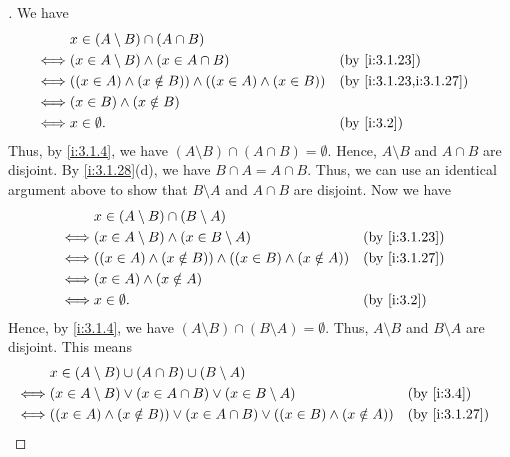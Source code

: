 \begin{proof}[]
  We have
  \begin{align*}
         & x \in (A \setminus B) \cap (A \cap B)                                                        \\
    \iff & (x \in A \setminus B) \land (x \in A \cap B)                     &  & \by{i:3.1.23}          \\
    \iff & ((x \in A) \land (x \notin B)) \land ((x \in A) \land (x \in B)) &  & \by{i:3.1.23,i:3.1.27} \\
    \iff & (x \in B) \land (x \notin B)                                                                 \\
    \iff & x \in \emptyset.                                                 &  & \by{i:3.2}
  \end{align*}
  Thus, by \cref{i:3.1.4}, we have \((A \setminus B) \cap (A \cap B) = \emptyset\).
  Hence, \(A \setminus B\) and \(A \cap B\) are disjoint.
  By \cref{i:3.1.28}(d), we have \(B \cap A = A \cap B\).
  Thus, we can use an identical argument above to show that \(B \setminus A\) and \(A \cap B\) are disjoint.
  Now we have
  \begin{align*}
         & x \in (A \setminus B) \cap (B \setminus A)                                             \\
    \iff & (x \in A \setminus B) \land (x \in B \setminus A)                   &  & \by{i:3.1.23} \\
    \iff & ((x \in A) \land (x \notin B)) \land ((x \in B) \land (x \notin A)) &  & \by{i:3.1.27} \\
    \iff & (x \in A) \land (x \notin A)                                                           \\
    \iff & x \in \emptyset.                                                    &  & \by{i:3.2}
  \end{align*}
  Hence, by \cref{i:3.1.4}, we have \((A \setminus B) \cap (B \setminus A) = \emptyset\).
  Thus, \(A \setminus B\) and \(B \setminus A\) are disjoint.
  This means
  \begin{align*}
         & x \in (A \setminus B) \cup (A \cap B) \cup (B \setminus A)                                                             \\
    \iff & (x \in A \setminus B) \lor (x \in A \cap B) \lor (x \in B \setminus A)                              &  & \by{i:3.4}    \\
    \iff & ((x \in A) \land (x \notin B)) \lor (x \in A \cap B) \lor ((x \in B) \land (x \notin A))            &  & \by{i:3.1.27} \\

\end{align*}
\end{proof}
